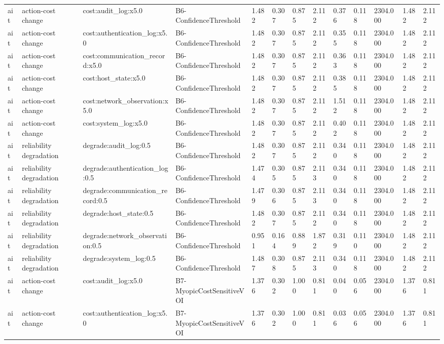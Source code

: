\begin{table}[!ht]
{\begin{tabular}{lllllllllllll}
ait & action-cost change & cost:audit\_log:x5.0 & B6-ConfidenceThreshold & 1.482 & 0.307 & 0.875 & 2.112 & 0.376 & 0.118 & 2304.000 & 1.482 & 2.112 \\
ait & action-cost change & cost:authentication\_log:x5.0 & B6-ConfidenceThreshold & 1.482 & 0.307 & 0.875 & 2.112 & 0.355 & 0.118 & 2304.000 & 1.482 & 2.112 \\
ait & action-cost change & cost:communication\_record:x5.0 & B6-ConfidenceThreshold & 1.482 & 0.307 & 0.875 & 2.112 & 0.363 & 0.118 & 2304.000 & 1.482 & 2.112 \\
ait & action-cost change & cost:host\_state:x5.0 & B6-ConfidenceThreshold & 1.482 & 0.307 & 0.875 & 2.112 & 0.385 & 0.118 & 2304.000 & 1.482 & 2.112 \\
ait & action-cost change & cost:network\_observation:x5.0 & B6-ConfidenceThreshold & 1.482 & 0.307 & 0.875 & 2.112 & 1.512 & 0.118 & 2304.000 & 1.482 & 2.112 \\
ait & action-cost change & cost:system\_log:x5.0 & B6-ConfidenceThreshold & 1.482 & 0.307 & 0.875 & 2.112 & 0.402 & 0.118 & 2304.000 & 1.482 & 2.112 \\
ait & reliability degradation & degrade:audit\_log:0.5 & B6-ConfidenceThreshold & 1.482 & 0.307 & 0.875 & 2.112 & 0.340 & 0.118 & 2304.000 & 1.482 & 2.112 \\
ait & reliability degradation & degrade:authentication\_log:0.5 & B6-ConfidenceThreshold & 1.474 & 0.305 & 0.875 & 2.113 & 0.340 & 0.118 & 2304.000 & 1.482 & 2.112 \\
ait & reliability degradation & degrade:communication\_record:0.5 & B6-ConfidenceThreshold & 1.479 & 0.306 & 0.875 & 2.113 & 0.340 & 0.118 & 2304.000 & 1.482 & 2.112 \\
ait & reliability degradation & degrade:host\_state:0.5 & B6-ConfidenceThreshold & 1.482 & 0.307 & 0.875 & 2.112 & 0.340 & 0.118 & 2304.000 & 1.482 & 2.112 \\
ait & reliability degradation & degrade:network\_observation:0.5 & B6-ConfidenceThreshold & 0.951 & 0.164 & 0.889 & 1.872 & 0.319 & 0.110 & 2304.000 & 1.482 & 2.112 \\
ait & reliability degradation & degrade:system\_log:0.5 & B6-ConfidenceThreshold & 1.487 & 0.308 & 0.875 & 2.113 & 0.340 & 0.118 & 2304.000 & 1.482 & 2.112 \\
ait & action-cost change & cost:audit\_log:x5.0 & B7-MyopicCostSensitiveVOI & 1.376 & 0.302 & 1.000 & 0.811 & 0.040 & 0.056 & 2304.000 & 1.376 & 0.811 \\
ait & action-cost change & cost:authentication\_log:x5.0 & B7-MyopicCostSensitiveVOI & 1.376 & 0.302 & 1.000 & 0.811 & 0.036 & 0.056 & 2304.000 & 1.376 & 0.811 \\

\end{tabular}}
\end{table}
